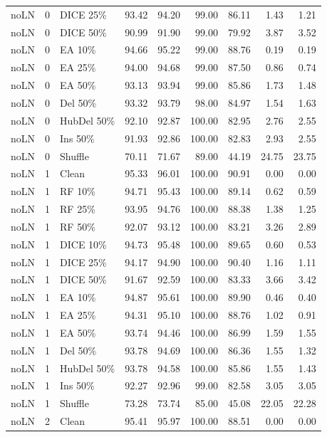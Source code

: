 {\begin{longtable}{rllrrrrrr}
noLN & 0 & DICE 25\% & 93.42 & 94.20 & 99.00 & 86.11 & 1.43 & 1.21 \\
noLN & 0 & DICE 50\% & 90.99 & 91.90 & 99.00 & 79.92 & 3.87 & 3.52 \\
noLN & 0 & EA 10\% & 94.66 & 95.22 & 99.00 & 88.76 & 0.19 & 0.19 \\
noLN & 0 & EA 25\% & 94.00 & 94.68 & 99.00 & 87.50 & 0.86 & 0.74 \\
noLN & 0 & EA 50\% & 93.13 & 93.94 & 99.00 & 85.86 & 1.73 & 1.48 \\
noLN & 0 & Del 50\% & 93.32 & 93.79 & 98.00 & 84.97 & 1.54 & 1.63 \\
noLN & 0 & HubDel 50\% & 92.10 & 92.87 & 100.00 & 82.95 & 2.76 & 2.55 \\
noLN & 0 & Ins 50\% & 91.93 & 92.86 & 100.00 & 82.83 & 2.93 & 2.55 \\
noLN & 0 & Shuffle & 70.11 & 71.67 & 89.00 & 44.19 & 24.75 & 23.75 \\
noLN & 1 & Clean & 95.33 & 96.01 & 100.00 & 90.91 & 0.00 & 0.00 \\
noLN & 1 & RF 10\% & 94.71 & 95.43 & 100.00 & 89.14 & 0.62 & 0.59 \\
noLN & 1 & RF 25\% & 93.95 & 94.76 & 100.00 & 88.38 & 1.38 & 1.25 \\
noLN & 1 & RF 50\% & 92.07 & 93.12 & 100.00 & 83.21 & 3.26 & 2.89 \\
noLN & 1 & DICE 10\% & 94.73 & 95.48 & 100.00 & 89.65 & 0.60 & 0.53 \\
noLN & 1 & DICE 25\% & 94.17 & 94.90 & 100.00 & 90.40 & 1.16 & 1.11 \\
noLN & 1 & DICE 50\% & 91.67 & 92.59 & 100.00 & 83.33 & 3.66 & 3.42 \\
noLN & 1 & EA 10\% & 94.87 & 95.61 & 100.00 & 89.90 & 0.46 & 0.40 \\
noLN & 1 & EA 25\% & 94.31 & 95.10 & 100.00 & 88.76 & 1.02 & 0.91 \\
noLN & 1 & EA 50\% & 93.74 & 94.46 & 100.00 & 86.99 & 1.59 & 1.55 \\
noLN & 1 & Del 50\% & 93.78 & 94.69 & 100.00 & 86.36 & 1.55 & 1.32 \\
noLN & 1 & HubDel 50\% & 93.78 & 94.58 & 100.00 & 85.86 & 1.55 & 1.43 \\
noLN & 1 & Ins 50\% & 92.27 & 92.96 & 99.00 & 82.58 & 3.05 & 3.05 \\
noLN & 1 & Shuffle & 73.28 & 73.74 & 85.00 & 45.08 & 22.05 & 22.28 \\
noLN & 2 & Clean & 95.41 & 95.97 & 100.00 & 88.51 & 0.00 & 0.00 \\

\end{longtable}}
